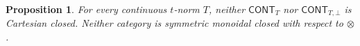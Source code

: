 \documentclass[preprint,3p,times]{elsarticle}
\newtheorem{proposition}[proposition]{Proposition}
\theoremstyle{definition}
\theoremstyle{remark}
\newcommand{\I}{\mathcal{I}}
\newcommand{\CONT}{\mathsf{CONT}}
\newcommand{\ev}{\operatorname{ev}}
\numberwithin{equation}{section}
\begin{document}
\begin{proposition}\label{prop:CONT-not-CCC}
For every continuous \(t\)-norm \(T\), neither \(\CONT_T\) nor \(\CONT_{T,\bot}\) is Cartesian closed. Neither category is symmetric monoidal closed with respect to \(\otimes\).
\end{proposition}



\end{document}

